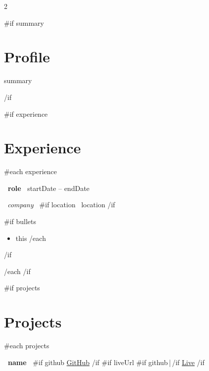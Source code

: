 \documentclass[10pt,a4paper]{article}
\begin{document}
\begin{paracol}{2}



{{#if summary}}
\section{Profile}

{{summary}}

{{/if}}


{{#if experience}}
\section{Experience}

{{#each experience}}

\textbf{ {{~role~}} }
\hfill
{\small\color{muted}
{{startDate}} -- {{endDate}} }

\par\vspace{1pt}

{\small
\textit{ {{~company~}} }
{{#if location}}
\textbullet\ {{location}}
{{/if}}
\par}

{{#if bullets}}
\vspace{1pt}
\begin{itemize}
{{#each bullets}}
    \item {{this}}
{{/each}}
\end{itemize}
{{/if}}

\vspace{3pt}

{{/each}}
{{/if}}


{{#if projects}}
\section{Projects}

{{#each projects}}

\noindent
\textbf{ {{~name~}} }
\hfill
{\small
{{#if github}}
\href{ {{~github~}} }{GitHub}
{{/if}}
{{#if liveUrl}}
{{#if github}}\,|\,{{/if}}
\href{ {{~liveUrl~}} }{Live}
{{/if}}
}
\par



\end{paracol}
\end{document}
